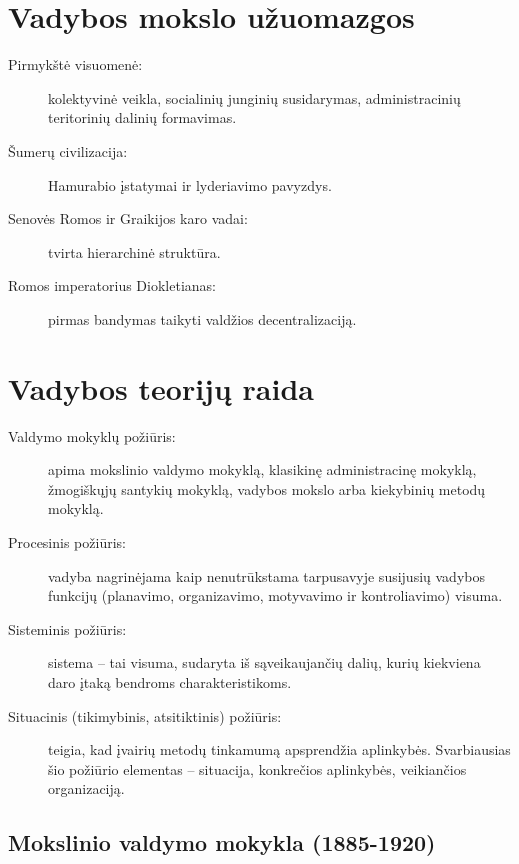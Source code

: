 \section{Vadybos mokslo užuomazgos}

\begin{description}
  \item[Pirmykštė visuomenė:] kolektyvinė veikla, socialinių junginių
    susidarymas, administracinių teritorinių dalinių formavimas.
  \item[Šumerų civilizacija:] Hamurabio įstatymai ir lyderiavimo
    pavyzdys.
  \item[Senovės Romos ir Graikijos karo vadai:] tvirta hierarchinė
    struktūra.
  \item[Romos imperatorius Diokletianas:] pirmas bandymas taikyti
    valdžios decentralizaciją.
\end{description}

\section{Vadybos teorijų raida}

\begin{description}
  \item[Valdymo mokyklų požiūris:] apima mokslinio valdymo mokyklą, 
    klasikinę administracinę mokyklą, žmogiškųjų santykių mokyklą,
    vadybos mokslo arba kiekybinių metodų mokyklą.
  \item[Procesinis požiūris:] vadyba nagrinėjama kaip nenutrūkstama
    tarpusavyje susijusių vadybos funkcijų (planavimo, organizavimo,
    motyvavimo ir kontroliavimo) visuma.
  \item[Sisteminis požiūris:] sistema – tai visuma, sudaryta iš
    sąveikaujančių dalių, kurių kiekviena daro įtaką bendroms
    charakteristikoms.
  \item[Situacinis (tikimybinis, atsitiktinis) požiūris:] teigia,
    kad įvairių metodų tinkamumą apsprendžia aplinkybės. Svarbiausias
    šio požiūrio elementas – situacija, konkrečios aplinkybės,
    veikiančios organizaciją.
\end{description}

\subsection{Mokslinio valdymo mokykla (1885-1920)}

